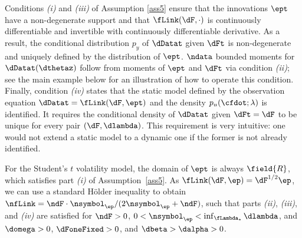 Conditions \textit{(i)} and \textit{(iii)} of Assumption \ref{ass5} ensure that the  innovations $\ept$ have a  non-degenerate support and that  $\fLink(\dF,\cdot)$ is continuously differentiable and invertible with continuously differentiable derivative. As a result, the conditional distribution $p_{y}$ of $\dDatat$ given $\dFt$ is non-degenerate and uniquely defined by the distribution of $\ept$.
$\ndata$ bounded moments for $\dDatat(\dthetaz)$ follow from moments of $\ept$ and $\dFt$ via condition \textit{(ii)}; see the main example below for an illustration of how to operate this condition. 
Finally, condition \textit{(iv)} states that the static model defined by the observation equation $\dDatat=\fLink(\dF,\ept)$ and the density $p_{u}(\cfdot;\lambda)$ is identified. It requires the conditional density of $\dDatat$ given $\dFt=\dF$ to be unique for every pair $(\dF,\dlambda)$. 
This requirement is very intuitive: one would not extend a static model to a dynamic one if the former is not already identified.


\begin{exmc} %
For the Student's $t$ volatility model, the domain of $\ept$ is always $\field{R}$, which satisfies part \textit{(i)} of Assumption~\ref{ass5}.
As $\fLink(\dF,\ep)=\dF^{1/2}\ep$, we can use a standard H\"older inequality to obtain $\nfLink=\ndF\cdot\nsymbol_\ep/(2\nsymbol_\ep+\ndF)$, such that parts \textit{(ii)}, \textit{(iii)}, and \textit{(iv)} are satisfied for $\ndF>0$, $0 < \nsymbol_\ep < \inf_{\fLambda_*} \dlambda$, and $\domega>0$, $\dFoneFixed>0$, and $\dbeta>\dalpha>0$.
\end{exmc}



